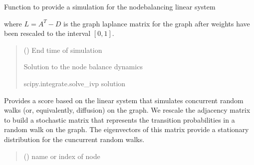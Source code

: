 \documentclass[letterpaper,10pt,english]{sphinxmanual}
\begin{document}
\begin{fulllineitems}
\begin{fulllineitems}
\begin{quote}
\begin{description}
\end{description}\end{quote}

\end{fulllineitems}


\begin{fulllineitems}
\label{\detokenize{friendlynets:friendlyNet.friendlyNet.node_balanced_system}}
\pysigstartsignatures
{}
\pysigstopsignatures
\sphinxAtStartPar
Function to provide a simulation for the node\sphinxhyphen{}balancing linear system

\sphinxAtStartPar
where \(L= A^T-D\) is the graph laplance matrix for the graph after weights have been rescaled to the interval \([0,1]\).
\begin{quote}\begin{description}
\sphinxAtStartPar
{} () \textendash{} End time of simulation

\sphinxAtStartPar
Solution to the node balance dynamics

\sphinxAtStartPar
scipy.integrate.solve\_ivp solution

\end{description}\end{quote}

\end{fulllineitems}


\begin{fulllineitems}
\label{\detokenize{friendlynets:friendlyNet.friendlyNet.stochastic_score}}
\pysigstartsignatures
{}
\pysigstopsignatures
\sphinxAtStartPar
Provides a score based on the linear system that simulates concurrent random walks (or, equivalently, diffusion) on the graph.
We rescale the adjacency matrix to build a stochastic matrix that represents the transition probabilities in a random walk on the graph.
The eigenvectors of this matrix provide a stationary distribution for the cuncurrent random walks.
\begin{quote}\begin{description}
\sphinxAtStartPar
{} () \textendash{} name or index of node


\end{description}
\end{quote}
\end{fulllineitems}
\end{fulllineitems}
\end{document}
